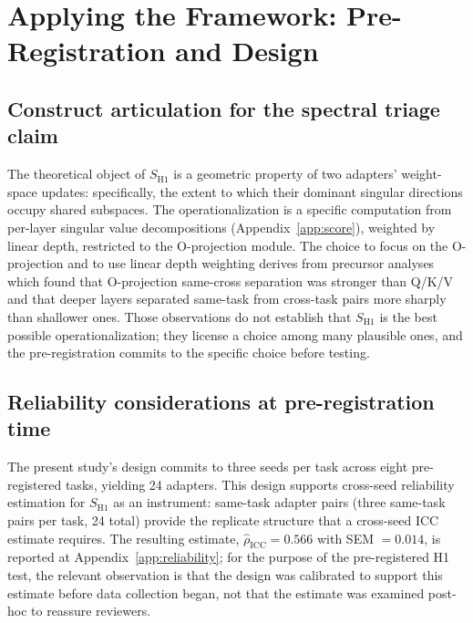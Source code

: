 \documentclass[10pt]{article}
\begin{document}
\section{Applying the Framework: Pre-Registration and Design}
\label{sec:applying}

\subsection{Construct articulation for the spectral triage claim}

The theoretical object of $S_{\mathrm{H1}}$ is a geometric property
of two adapters' weight-space updates: specifically, the extent to
which their dominant singular directions occupy shared subspaces.
The operationalization is a specific computation from per-layer
singular value decompositions (Appendix~\ref{app:score}), weighted
by linear depth, restricted to the O-projection module. The choice
to focus on the O-projection and to use linear depth weighting
derives from precursor analyses
\citep{anonymized2026descriptive} which found that O-projection
same-cross separation was stronger than Q/K/V and that deeper layers
separated same-task from cross-task pairs more sharply than
shallower ones. Those observations do not establish that
$S_{\mathrm{H1}}$ is the best possible operationalization; they
license a choice among many plausible ones, and the pre-registration
commits to the specific choice before testing.

\subsection{Reliability considerations at pre-registration time}
\label{sec:applying-reliability}

The present study's design commits to three seeds per task across eight
pre-registered tasks, yielding 24 adapters. This design supports
cross-seed reliability estimation for $S_{\mathrm{H1}}$ as an
instrument: same-task adapter pairs (three same-task pairs per task,
24 total) provide the replicate structure that a cross-seed ICC
estimate requires. The resulting estimate,
$\hat{\rho}_{\mathrm{ICC}} = 0.566$ with SEM $= 0.014$, is
reported at Appendix~\ref{app:reliability}; for the purpose of the
pre-registered H1 test, the relevant observation is that the design
was calibrated to support this estimate before data collection began,
not that the estimate was examined post-hoc to reassure reviewers.
\end{document}
